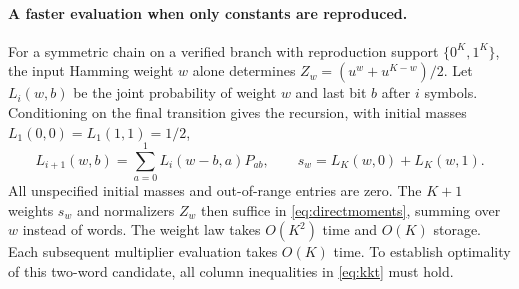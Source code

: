 \documentclass[11pt,letterpaper]{article}
\theoremstyle{definition}
\begin{document}
\paragraph{A faster evaluation when only constants are reproduced.}
For a symmetric chain on a verified branch with reproduction support $\{0^K,1^K\}$, the input Hamming weight $w$ alone determines $Z_w=(u^w+u^{K-w})/2$. Let $L_i(w,b)$ be the joint probability of weight $w$ and last bit $b$ after $i$ symbols. Conditioning on the final transition gives the recursion, with initial masses $L_1(0,0)=L_1(1,1)=1/2$,
\[
 L_{i+1}(w,b)=\sum_{a=0}^1 L_i(w-b,a)P_{ab},\qquad
 s_w=L_K(w,0)+L_K(w,1).
\]
All unspecified initial masses and out-of-range entries are zero. The $K+1$ weights $s_w$ and normalizers $Z_w$ then suffice in \eqref{eq:directmoments}, summing over $w$ instead of words. The weight law takes $O(K^2)$ time and $O(K)$ storage. Each subsequent multiplier evaluation takes $O(K)$ time. To establish optimality of this two-word candidate, all column inequalities in \eqref{eq:kkt} must hold.
\end{document}
